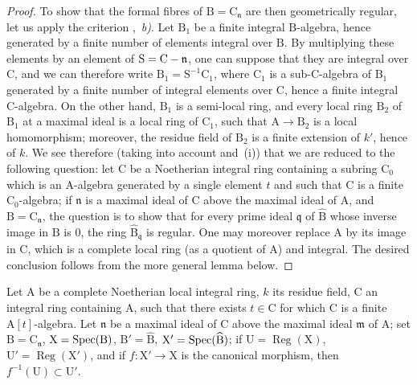 \begin{proof}
To show that the formal fibres of $\mathrm{B}=\mathrm{C}_\mathfrak{n}$ are then geometrically regular, let us apply the criterion ,~\emph{b)}.
Let $\mathrm{B}_1$ be a finite integral $\mathrm{B}$-algebra, hence generated by a finite number of elements integral over $\mathrm{B}$.
By multiplying these elements by an element of $\mathrm{S}=\mathrm{C}-\mathfrak{n}$, one can suppose that they are integral over $\mathrm{C}$, and we can therefore write $\mathrm{B}_1=\mathrm{S}^{-1}\mathrm{C}_1$, where $\mathrm{C}_1$ is a sub-C-algebra of $\mathrm{B}_1$ generated by a finite number of integral elements over $\mathrm{C}$, hence a finite integral C-algebra.
On the other hand, $\mathrm{B}_1$ is a semi-local ring, and every local ring $\mathrm{B}_2$ of $\mathrm{B}_1$ at a maximal ideal is a local ring of $\mathrm{C}_1$, such that $\mathrm{A}\to\mathrm{B}_2$ is a local homomorphism; moreover, the residue field of $\mathrm{B}_2$ is a finite extension of $k'$, hence of $k$.
We see therefore (taking into account  and~(i)) that we are reduced to the following question: let $\mathrm{C}$ be a Noetherian integral ring containing a subring $\mathrm{C}_0$ which is an $\mathrm{A}$-algebra generated by a single element $t$ and such that $\mathrm{C}$ is a finite $\mathrm{C}_0$-algebra; if $\mathfrak{n}$ is a maximal ideal of $\mathrm{C}$
above the maximal ideal of $\mathrm{A}$, and $\mathrm{B}=\mathrm{C}_\mathfrak{n}$, the question is to show that for every prime ideal $\mathfrak{q}$ of $\widehat{\mathrm{B}}$ whose inverse image in $\mathrm{B}$ is $0$, the ring $\widehat{\mathrm{B}}_\mathfrak{q}$ is regular.
One may moreover replace $\mathrm{A}$ by its image in $\mathrm{C}$, which is a complete local ring (as a quotient of $\mathrm{A}$) and integral. The desired conclusion follows from the more general lemma below.
\end{proof}

\begin{lemma}[7.4.4.2]
\label{IV.7.4.4.2}
Let $\mathrm{A}$ be a complete Noetherian local integral ring, $k$ its residue field, $\mathrm{C}$ an integral ring containing $\mathrm{A}$, such that there exists $t\in\mathrm{C}$ for which $\mathrm{C}$ is a finite $\mathrm{A}[t]$-algebra.
Let $\mathfrak{n}$ be a maximal ideal of $\mathrm{C}$ above the maximal ideal $\mathfrak{m}$ of $\mathrm{A}$; set $\mathrm{B}=\mathrm{C}_\mathfrak{n}$, $\mathrm{X}=\operatorname{Spec}(\mathrm{B})$, $\mathrm{B}'=\widehat{\mathrm{B}}$, $\mathrm{X}'=\operatorname{Spec}(\widehat{\mathrm{B}})$; if $\mathrm{U}=\operatorname{Reg}(\mathrm{X})$, $\mathrm{U}'=\operatorname{Reg}(\mathrm{X}')$, and if $f:\mathrm{X}'\to\mathrm{X}$ is the canonical morphism, then $f^{-1}(\mathrm{U})\subset\mathrm{U}'$.
\end{lemma}

